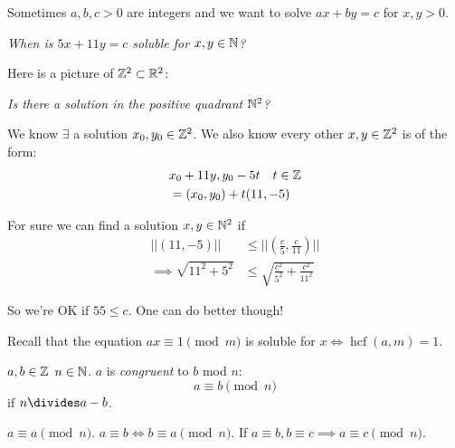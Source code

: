 \documentclass[twoside]{scrartcl}
\DeclareMathOperator{\hcf}{hcf}
\begin{document}
Sometimes $a,b, c >0$ are integers and we want to solve $ax + by = c$ for $x,y  > 0$.\\

\begin{example}
\emph{When is $5x + 11y = c$ soluble for $x,y \in\mathbb{N}$? }

Here is a picture of $\mathbb{Z}^2 \subset \mathbb{R}^2$: 

\begin{center}
\end{center}

\emph{Is there a solution in the positive quadrant $\mathbb{N}^2$?}


We know $\exists$ a solution $x_0,y_0\in\mathbb{Z}^2$. We also know every other $x,y \in\mathbb{Z}^2$ is of the form: 
\[
\begin{aligned}
 & x_0 + 11y, y_0 - 5t \quad t \in\mathbb{Z}\\
 &= (x_0,y_0) + t(11,-5)
\end{aligned}
\]

For sure we can find a solution $x,y \in\mathbb{N}^2$ if
\[
\begin{aligned}
  ||(11,-5)|| &\leq ||\textstyle{\left(\frac{c}{5},\frac{c}{11}\right)}||\\
  \implies \sqrt{11^2 + 5^2} &\leq \sqrt{\textstyle{\frac{c^2}{5^2}+\frac{c^2}{11^2}}}
\end{aligned}
\]

So we're OK if $55 \leq c$. One can do better though! 
\end{example}


Recall that the equation
$ax \equiv 1 \pmod{m}$
is soluble for $x \iff \hcf(a,m) = 1$.



\vspace*{10pt}

\begin{definition} 
$a,b\in\mathbb{Z}$ $n\in\mathbb{N}$. $a$ is \emph{congruent} to $b$ mod $n$: 
\[a \equiv b \pmod{n} \]	
if $n \divides a - b$. 
\end{definition}

\begin{remark}
$a \equiv a \pmod{n}$. $a \equiv b \iff b \equiv a \pmod{n}$. If $a \equiv b, b \equiv c \implies a \equiv c \pmod{n}$. 	
\end{remark}
\end{document}
